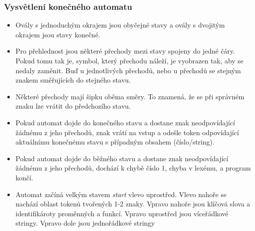 \documentclass[a4paper, 12pt]{article}
\begin{document}

\subsubsection{Vysvětlení konečného automatu}
\begin{itemize}
    \item Ovály s jednoduchým okrajem jsou obyčejné stavy a ovály s dvojitým okrajem jsou stavy konečné.
    \item Pro přehlednost jsou některé přechody mezi stavy spojeny do jedné čáry. Pokud tomu tak je, symbol, který přechodu náleží, je vyobrazen tak, aby se nedaly zaměnit. Buď u jednotlivých přechodů, nebo u přechodů se stejným znakem směřujících do stejného stavu. 
    \item Některé přechody mají šipku oběma směry. To znamená, že se při správném znaku lze vrátit do předchozího stavu.
    \item Pokud automat dojde do konečného stavu a dostane znak neodpovídající žádnému z jeho přechodů, znak vrátí na vstup a odešle token odpovídající aktuálnímu konečnému stavu s případným obsahem (číslo/string).
    \item Pokud automat dojde do běžného stavu a dostane znak neodpovídající žádnému z jeho přechodů, dochází k chybě číslo 1, chyba v lexému, a program končí.
    \item Automat začíná velkým stavem \textit{start} vlevo uprostřed. Vlevo nahoře se nachází oblast tokenů tvořených 1-2 znaky. Vpravo nahoře jsou klíčová slova a identifikároty proměnných a funkcí. Vpravo uprostřed jsou víceřádkové stringy. Vpravo dole jsou jednořádkové stringy
\end{itemize}

\newpage
\end{document}
